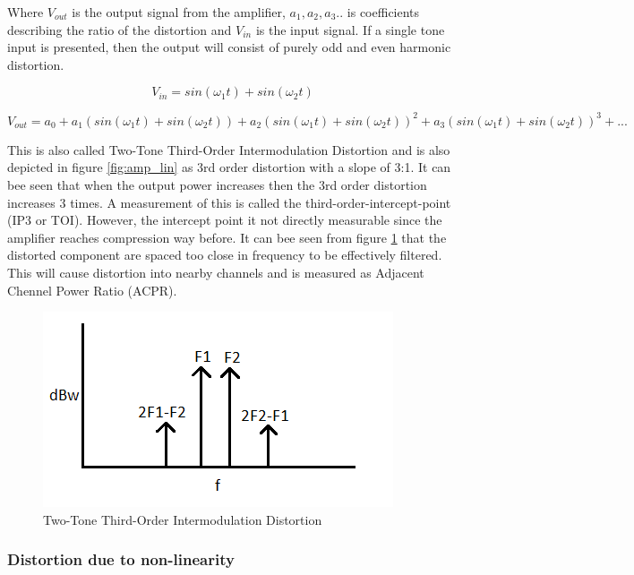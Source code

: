 Where $V_{out}$ is the output signal from the amplifier, $a_1, a_2 ,a_3..$ is coefficients describing the ratio of the distortion and $V_{in}$ is the input signal. If a single tone input is presented, then the output will consist of purely odd and even harmonic distortion. 

\begin{equation}\label{eq:dest1}
V_{in} = sin(\omega_1 t) + sin(\omega_2 t)
\end{equation} 

\begin{equation} \label{eq:dest2}
V_{out} = a_0 + a_1 (sin(\omega_1 t) + sin(\omega_2 t)) + a_2 (sin(\omega_1 t) + sin(\omega_2 t))^2 + a_3 (sin(\omega_1 t) + sin(\omega_2 t))^3 + ... 
\end{equation}

This is also called Two-Tone Third-Order Intermodulation Distortion and is also depicted in figure \ref{fig:amp_lin} as 3rd order distortion with a slope of 3:1. It can bee seen that when the output power increases then the 3rd order distortion increases 3 times. A measurement of this is called the third-order-intercept-point (IP3 or TOI). However, the intercept point it not directly measurable since the amplifier reaches compression way before. It can bee seen from figure \ref{fig:amp_psd} that the distorted component are spaced too close in frequency to be effectively filtered. This will cause distortion into nearby channels and is measured as Adjacent Chennel Power Ratio (ACPR).

\begin{figure}[H]
\centering 
\includegraphics[scale = 0.7]{figures/ch1/amp_psd.png}
\caption{Two-Tone Third-Order Intermodulation Distortion}
\label{fig:amp_psd}
\end{figure}

\subsubsection{Distortion due to non-linearity}

